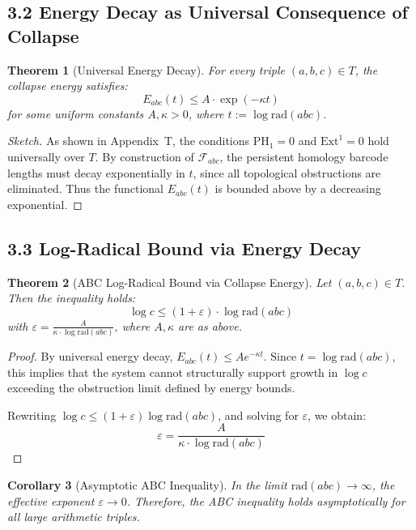 \documentclass[11pt]{article}
\newtheorem{theorem}{Theorem}[section]
\newtheorem{corollary}[theorem]{Corollary}
\begin{document}
\subsection{3.2 Energy Decay as Universal Consequence of Collapse}

\begin{theorem}[Universal Energy Decay]
For every triple \( (a,b,c) \in T \), the collapse energy satisfies:
\[
E_{abc}(t) \leq A \cdot \exp(-\kappa t)
\]
for some uniform constants \( A, \kappa > 0 \), where \( t := \log \mathrm{rad}(abc) \).
\end{theorem}

\begin{proof}[Sketch]
As shown in Appendix~T, the conditions \( \mathrm{PH}_1 = 0 \) and \( \mathrm{Ext}^1 = 0 \) hold universally over \( T \).  
By construction of \( \mathcal{F}_{abc} \), the persistent homology barcode lengths must decay exponentially in \( t \), since all topological obstructions are eliminated.  
Thus the functional \( E_{abc}(t) \) is bounded above by a decreasing exponential.
\end{proof}

\subsection{3.3 Log-Radical Bound via Energy Decay}

\begin{theorem}[ABC Log-Radical Bound via Collapse Energy]
Let \( (a, b, c) \in T \). Then the inequality holds:
\[
\log c \leq (1 + \varepsilon) \cdot \log \mathrm{rad}(abc)
\]
with \( \varepsilon = \frac{A}{\kappa \cdot \log \mathrm{rad}(abc)} \), where \( A, \kappa \) are as above.
\end{theorem}

\begin{proof}
By universal energy decay, \( E_{abc}(t) \leq A e^{-\kappa t} \).  
Since \( t = \log \mathrm{rad}(abc) \), this implies that the system cannot structurally support growth in \( \log c \) exceeding the obstruction limit defined by energy bounds.

Rewriting \( \log c \leq (1+\varepsilon) \log \mathrm{rad}(abc) \), and solving for \( \varepsilon \), we obtain:
\[
\varepsilon = \frac{A}{\kappa \cdot \log \mathrm{rad}(abc)}
\]
\end{proof}

\begin{corollary}[Asymptotic ABC Inequality]
In the limit \( \mathrm{rad}(abc) \to \infty \), the effective exponent \( \varepsilon \to 0 \).  
Therefore, the ABC inequality holds asymptotically for all large arithmetic triples.
\end{corollary}
\end{document}
